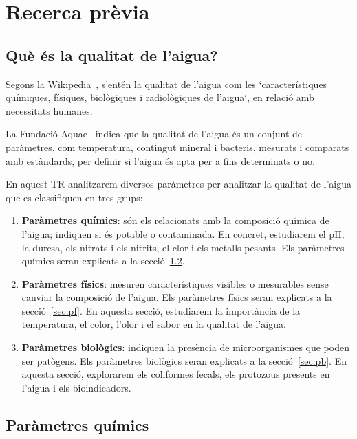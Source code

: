 \chapter{Recerca prèvia}
\label{c:RecercaPrevia}
\section{Què és la qualitat de l’aigua?}

Segons la Wikipedia~\cite{WikiAgua}, s'entén la qualitat de l'aigua com les `característiques químiques, físiques, biològiques i radiològiques de l'aigua`, en relació amb necessitats humanes.

La Fundació Aquae~\cite{Fundacionaquae} indica que la qualitat de l'aigua és un conjunt de paràmetres, com temperatura, contingut mineral i bacteris, mesurats i comparats amb estàndards, per definir si l'aigua és apta per a fins determinats o no.

En aquest TR analitzarem diversos paràmetres per analitzar la qualitat de l'aigua que es classifiquen en tres grups:
\begin{enumerate}
  \item \textbf{Paràmetres químics}: són els relacionats amb la composició química de l’aigua; indiquen si és potable o contaminada. En concret, estudiarem el pH, la duresa, els nitrats i els nitrits, el clor i els metalls pesants. Els paràmetres químics seran explicats a la secció~\ref{sec:pq}.
  \item \textbf{Paràmetres físics}: mesuren característiques visibles o mesurables sense canviar la composició de l’aigua. Els paràmetres físics seran explicats a la secció~\ref{sec:pf}. En aquesta secció, estudiarem la importància de la temperatura, el color, l’olor i el sabor en la qualitat de l’aigua.
  \item \textbf{Paràmetres biològics}: indiquen la presència de microorganismes que poden ser patògens. Els paràmetres biològics seran explicats a la secció~\ref{sec:pb}. En aquesta secció, explorarem els coliformes fecals, els protozous presents en l’aigua i els bioindicadors.
\end{enumerate}


\section{Paràmetres químics} \label{sec:pq}

